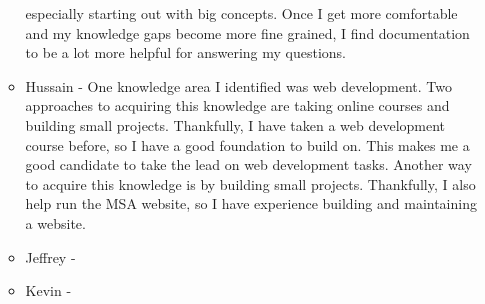 \begin{enumerate}
\begin{itemize}
          especially starting out with big concepts. Once I get more
          comfortable and my knowledge gaps become more fine grained, I find
          documentation to be a lot more helpful for answering my questions.
        \item Hussain - One knowledge area I identified was web development. Two
        approaches to acquiring this knowledge are taking online courses and
        building small projects. Thankfully, I have taken a web development
        course before, so I have a good foundation to build on. This makes me a
        good candidate to take the lead on web development tasks. Another way
        to acquire this knowledge is by building small projects. Thankfully, I 
        also help run the MSA website, so I have experience building and
        maintaining a website. 
        \item Jeffrey - 
        \item Kevin - 
  \end{itemize} 
\end{enumerate}
